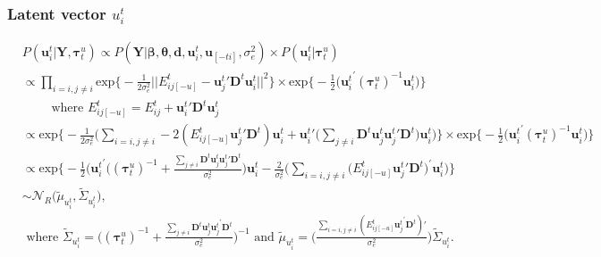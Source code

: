 \documentclass[a4paper]{article}
\begin{document}
	\subsubsection{Latent vector $u_i^t$}
	\begin{equation}
	\begin{aligned}
	&P(\boldsymbol{u}_i^t|\mathbf{Y}, \boldsymbol{\tau}_t^u) \propto P(\mathbf{Y}| \boldsymbol{\beta}, \boldsymbol{\theta}, \boldsymbol{d}, \boldsymbol{u}_i^t, \boldsymbol{u}_{[-ti]},\sigma_e^2) \times P(\boldsymbol{u}_i^t| \boldsymbol{\tau}_t^u) \\
	&\propto\prod\limits_{i=i, j\neq i}\mbox{exp}\Big\{-\frac{1}{2\sigma_e^2}||E^{t}_{ij[-u]}-{\boldsymbol{u}^t_{j}}'\mathbf{D}^t\boldsymbol{u}^t_{i}||^2\Big\}\times \mbox{exp}\Big\{-\frac{1}{2}\big({\boldsymbol{u}_i^t}^\prime(\boldsymbol{\tau}_t^u)^{-1}\boldsymbol{u}_i^t\big)\Big\}\\
	&\quad\quad\mbox{ where } E^t_{ij[-u]}=E^t_{ij}+{\boldsymbol{u}^t_{i}}'\mathbf{D}^t\boldsymbol{u}^t_{j}\\
	&\propto\mbox{exp}\Big\{-\frac{1}{2\sigma_e^2}\Big(\sum\limits_{i=i, j\neq i}-2(E^{t}_{ij[-u]}{\boldsymbol{u}^t_{j}}'\mathbf{D}^t)\boldsymbol{u}^t_i+{\boldsymbol{u}^t_i}'\big(\sum\limits_{j\neq i}\mathbf{D}^t\boldsymbol{u}^t_{j}{\boldsymbol{u}^t_{j}}'\mathbf{D}^t\big)\boldsymbol{u}^t_i\Big)\Big\}\times \mbox{exp}\Big\{-\frac{1}{2}\big({\boldsymbol{u}_i^t}^\prime(\boldsymbol{\tau}_t^u)^{-1}\boldsymbol{u}_i^t\big)\Big\}\\
	&\propto\mbox{exp}\Big\{-\frac{1}{2}\Big({\boldsymbol{u}_i^t}^\prime\big((\boldsymbol{\tau}_t^u)^{-1}+\frac{\sum_{j\neq i}\mathbf{D}^t\boldsymbol{u}^t_{j}{\boldsymbol{u}^t_{j}}'\mathbf{D}^t}{\sigma_e^2}\big)\boldsymbol{u}^t_i-\frac{2}{\sigma_e^2}\big(\sum_{i=i, j\neq i}(E^{t}_{ij[-u]}{\boldsymbol{u}^t_{j}}'\mathbf{D}^t\big)^\prime \boldsymbol{u}^t_i\Big)\Big\}\\
	& \sim \mathcal{N}_R\big(\tilde{\mu}_{u^t_{i}}, \tilde{\Sigma}_{u^t_{i}} \big),
	\\
	& \mbox{ where }
	\tilde{\Sigma}_{u^t_{i}} = \Big((\boldsymbol{\tau}^u_t)^{-1}+\frac{\sum_{j\neq i}\mathbf{D}^t\boldsymbol{u}^t_{j}{\boldsymbol{u}^t_{j}}^\prime \mathbf{D}^t}{\sigma_e^2}\Big)^{-1}\mbox{ and } \tilde{\mu}_{u^t_{i}} = \Big(\frac{\sum_{i=i, j\neq i}(E^{t}_{ij[-u]}{\boldsymbol{u}^t_{j}}^\prime \mathbf{D}^t)'}{{\sigma_e^2}}\Big)\tilde{\Sigma}_{u^t_{i}}.
	\end{aligned}
	\end{equation} 
\end{document}
